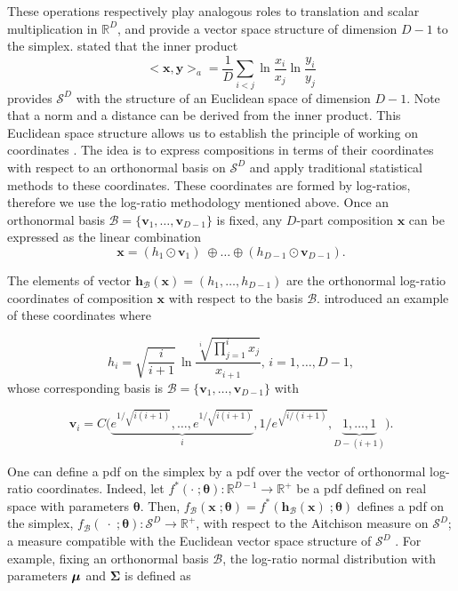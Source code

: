 \documentclass[12pt, a4paper]{article}
\newcommand{\m}[1]{\boldsymbol{#1}}
\theoremstyle{definition}
\begin{document}
These operations respectively play analogous roles to translation and scalar multiplication in $\mathbb{R}^D$, and provide a vector space
structure of dimension $D-1$ to the simplex. \cite{pawlowsky2001geometric} stated that the inner product 
\begin{equation}
<\textbf{x}, \textbf{y}>_a = \frac{1}{D} \sum_{i < j} \ln \frac{x_i}{x_j} \ln \frac{y_i}{y_j}
\label{inner_prod}
\end{equation}
 provides $\mathcal{S}^D$ with the structure of an Euclidean space of dimension $D-1$. Note that a norm and a distance can be derived from the inner product.
This Euclidean space structure allows us to establish the principle of working on coordinates \citep{figueras2011principle}. The idea is to express compositions in terms of their coordinates with respect to an orthonormal basis on $\mathcal{S}^D$ and apply
traditional statistical methods to these coordinates. These coordinates are formed by log-ratios, therefore we use the log-ratio methodology mentioned above. Once an orthonormal basis $\mathcal{B} = \{\textbf{v}_1, \dots, \textbf{v}_{D-1}\}$ is fixed, any $D$-part composition $\textbf{x}$ can be expressed as the linear combination
\[
\textbf{x} = (h_1 \odot \textbf{v}_1)\; \oplus \dots  \oplus (h_{D-1} \odot \textbf{v}_{D-1}).
\]

The elements of vector $\textbf{h}_\mathcal{B}(\textbf{x})=(h_1, \dots, h_{D-1})$ are the orthonormal log-ratio coordinates of composition $\textbf{x}$ with respect to the basis $\mathcal{B}$. \cite{egozcue2003isometric} introduced an example of these coordinates where

\begin{equation}
\label{eilr}
h_i=\sqrt{\frac{i}{i+1}}\,\ln\frac{\sqrt[i]
{\prod_{j=1}^{i} x_j}}{x_{i+1}},\,i=1,\dots,D-1,
\end{equation}
whose corresponding basis is $\mathcal{B} = \{\textbf{v}_1, \dots, \textbf{v}_{D-1}\}$ with

\[
\textbf{v}_i = C\Big( \underbrace{e^{1/\sqrt{i(i+1)}}, \dots, e^{1/\sqrt{i(i+1)}}}_{i}, 1/e^{\sqrt{ i/(i+1)}}, \underbrace{1, \dots, 1}_{D-(i+1)} \Big).
\]


One can define a pdf on the simplex by a pdf over the vector of orthonormal log-ratio coordinates. Indeed, let $f^*(\cdot \;; \m\theta) : \mathbb{R}^{D-1} \rightarrow \mathbb{R}^+$ be a pdf defined on real space with parameters $\m\theta$. Then, $f_\mathcal{B}(\mathbf{x}\;; \m\theta) = f^*(\mathbf{h}_\mathcal{B}(\textbf{x})\;; \m\theta)$ defines a pdf on the simplex, $f_\mathcal{B}(\;\cdot\;; \m\theta): \mathcal{S}^D \rightarrow \mathbb{R}^+$, with respect to the Aitchison measure on $\mathcal{S}^D$; a measure compatible with the Euclidean vector space structure of $\mathcal{S}^D$ \citep{mateu2013normal}. For example, fixing an orthonormal basis $\mathcal{B}$, the log-ratio normal distribution with parameters $\mbox{\boldmath \(\mu\)}$ and $\mathbf{\Sigma}$ is defined as
\end{document}
